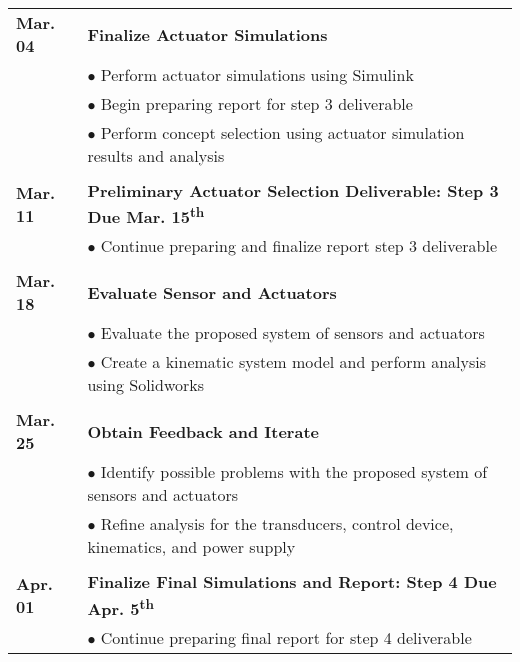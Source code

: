 \documentclass[12pt]{article}
\newcommand{\ts}{\textsuperscript}
\begin{document}
\begin{flushleft}
\begin{tabular}{l | l}
\textbf{Mar. 04} & \textbf{Finalize Actuator Simulations}\\
 & $\bullet$ Perform actuator simulations using Simulink\\
 & $\bullet$ Begin preparing report for step 3 deliverable\\
 & $\bullet$ Perform concept selection using actuator simulation results and analysis\\\\
 
\textbf{Mar. 11} &\textbf{Preliminary Actuator Selection Deliverable: Step 3 Due Mar. 15\ts{th}}\\
 & $\bullet$ Continue preparing and finalize report step 3 deliverable\\\\
 
\textbf{Mar. 18} & \textbf{Evaluate Sensor and Actuators}\\
 & $\bullet$ Evaluate the proposed system of sensors and actuators\\
  & $\bullet$ Create a kinematic system model and perform analysis using Solidworks\\\\
  
\textbf{Mar. 25} & \textbf{Obtain Feedback and Iterate}\\
  & $\bullet$ Identify possible problems with the proposed system of sensors and actuators\\
  & $\bullet$ Refine analysis for the transducers, control device, kinematics, and power supply\\\\
  
\textbf{Apr. 01} & \textbf{Finalize Final Simulations and Report: Step 4 Due Apr. 5\ts{th}}\\
 & $\bullet$ Continue preparing final report for step 4 deliverable\\

\end{tabular}
\end{flushleft}
\end{document}
